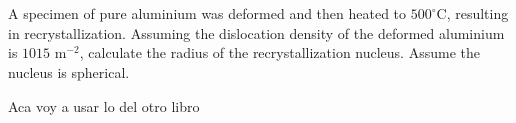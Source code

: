 \newpage
\section{}

A specimen of pure aluminium was deformed and then heated to $500^{\circ}$C, resulting in recrystallization. Assuming the dislocation density of the deformed aluminium is $1015$ m$^{-2}$, calculate the radius of the recrystallization nucleus. Assume the nucleus is spherical.



Aca voy a usar lo del otro libro \citet{rollett2017recrystallization}